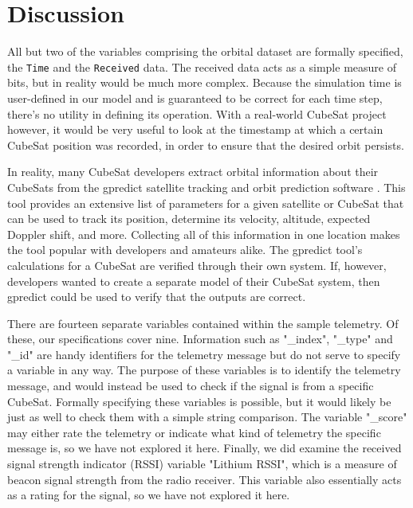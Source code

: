 \documentclass[conf]{new-aiaa}
\begin{document}
\section{Discussion}  \label{Discussion}

All but two of the variables comprising the orbital dataset are formally specified, the \texttt{Time} and the \texttt{Received} data. The received data acts as a simple measure of bits, but in reality would be much more complex. Because the simulation time is user-defined in our model and is guaranteed to be correct for each time step, there's no utility in defining its operation. With a real-world CubeSat project however, it would be very useful to look at the timestamp at which a certain CubeSat position was recorded, in order to ensure that the desired orbit persists.

In reality, many CubeSat developers extract orbital information about their CubeSats from the gpredict satellite tracking and orbit prediction software \cite{csete2018}. This tool provides an extensive list of parameters for a given satellite or CubeSat that can be used to track its position, determine its velocity, altitude, expected Doppler shift, and more. Collecting all of this information in one location makes the tool popular with developers and amateurs alike. The gpredict tool's calculations for a CubeSat are verified through their own system. If, however, developers wanted to create a separate model of their CubeSat system, then gpredict could be used to verify that the outputs are correct.

There are fourteen separate variables contained within the sample telemetry. Of these, our specifications cover nine. Information such as "\_index", "\_type" and "\_id" are handy identifiers for the telemetry message but do not serve to specify a variable in any way. The purpose of these variables is to identify the telemetry message, and would instead be used to check if the signal is from a specific CubeSat. Formally specifying these variables is possible, but it would likely be just as well to check them with a simple string comparison. The variable "\_score" may either rate the telemetry or indicate what kind of telemetry the specific message is, so we have not explored it here. Finally, we did examine the received signal strength indicator (RSSI) variable "Lithium RSSI", which is a measure of beacon signal strength from the radio receiver. This variable also essentially acts as a rating for the signal, so we have not explored it here.
\end{document}
